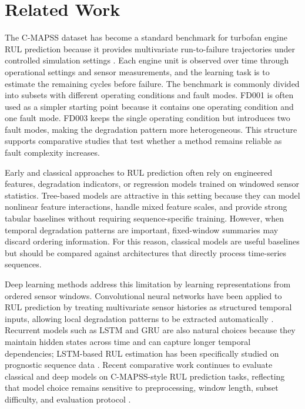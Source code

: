 \documentclass[11pt,a4paper]{article}
\begin{document}
\section{Related Work}

The C-MAPSS dataset has become a standard benchmark for turbofan engine RUL prediction because it provides multivariate run-to-failure trajectories under controlled simulation settings \citep{NASA_PCoE,Saxena2008}. Each engine unit is observed over time through operational settings and sensor measurements, and the learning task is to estimate the remaining cycles before failure. The benchmark is commonly divided into subsets with different operating conditions and fault modes. FD001 is often used as a simpler starting point because it contains one operating condition and one fault mode. FD003 keeps the single operating condition but introduces two fault modes, making the degradation pattern more heterogeneous. This structure supports comparative studies that test whether a method remains reliable as fault complexity increases.

Early and classical approaches to RUL prediction often rely on engineered features, degradation indicators, or regression models trained on windowed sensor statistics. Tree-based models are attractive in this setting because they can model nonlinear feature interactions, handle mixed feature scales, and provide strong tabular baselines without requiring sequence-specific training. However, when temporal degradation patterns are important, fixed-window summaries may discard ordering information. For this reason, classical models are useful baselines but should be compared against architectures that directly process time-series sequences.

Deep learning methods address this limitation by learning representations from ordered sensor windows. Convolutional neural networks have been applied to RUL prediction by treating multivariate sensor histories as structured temporal inputs, allowing local degradation patterns to be extracted automatically \citep{Babu2016}. Recurrent models such as LSTM and GRU are also natural choices because they maintain hidden states across time and can capture longer temporal dependencies; LSTM-based RUL estimation has been specifically studied on prognostic sequence data \citep{Zheng2017}. Recent comparative work continues to evaluate classical and deep models on C-MAPSS-style RUL prediction tasks, reflecting that model choice remains sensitive to preprocessing, window length, subset difficulty, and evaluation protocol \citep{Goel2026}.
\end{document}

